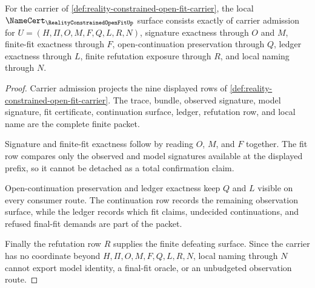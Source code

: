 \begin{theorem}
\label{thm:reality-constrained-open-fit-namecert-obligations}
For the carrier of \autoref{def:reality-constrained-open-fit-carrier}, the local $\NameCert_{\RealityConstrainedOpenFitUp}$ surface consists exactly of carrier admission for $U=(H,\Pi,O,M,F,Q,L,R,N)$, signature exactness through $O$ and $M$, finite-fit exactness through $F$, open-continuation preservation through $Q$, ledger exactness through $L$, finite refutation exposure through $R$, and local naming through $N$.
\end{theorem}
\begin{proof}
Carrier admission projects the nine displayed rows of \autoref{def:reality-constrained-open-fit-carrier}. The trace, bundle, observed signature, model signature, fit certificate, continuation surface, ledger, refutation row, and local name are the complete finite packet.

Signature and finite-fit exactness follow by reading $O$, $M$, and $F$ together. The fit row compares only the observed and model signatures available at the displayed prefix, so it cannot be detached as a total confirmation claim.

Open-continuation preservation and ledger exactness keep $Q$ and $L$ visible on every consumer route. The continuation row records the remaining observation surface, while the ledger records which fit claims, undecided continuations, and refused final-fit demands are part of the packet.

Finally the refutation row $R$ supplies the finite defeating surface. Since the carrier has no coordinate beyond $H,\Pi,O,M,F,Q,L,R,N$, local naming through $N$ cannot export model identity, a final-fit oracle, or an unbudgeted observation route.
\end{proof}

